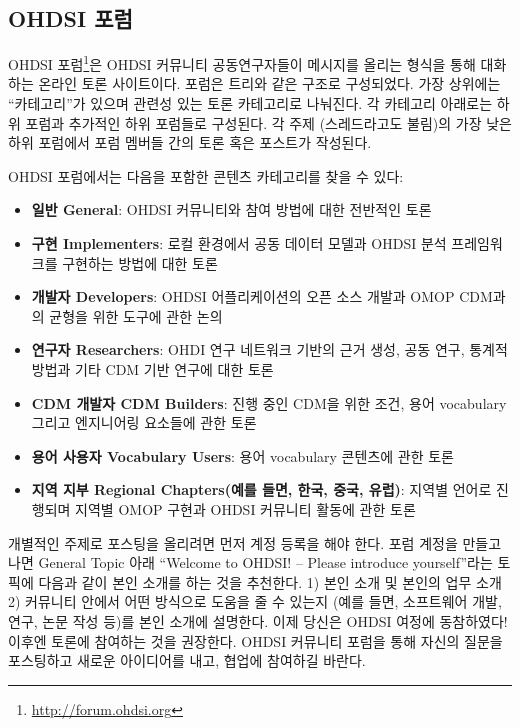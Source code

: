\documentclass[10.5pt]{book}
\providecommand{\tightlist}{%
  \setlength{\itemsep}{0pt}\setlength{\parskip}{0pt}}
\let\rmarkdownfootnote\footnote%
\def\footnote{\protect\rmarkdownfootnote}
\theoremstyle{definition}
\theoremstyle{definition}
\theoremstyle{definition}
\theoremstyle{remark}
\begin{document}
\hypertarget{ohdsi-}{\subsection{OHDSI 포럼}\label{ohdsi-}}

OHDSI 포럼\footnote{\url{http://forum.ohdsi.org}}은 OHDSI 커뮤니티
공동연구자들이 메시지를 올리는 형식을 통해 대화하는 온라인 토론
사이트이다. 포럼은 트리와 같은 구조로 구성되었다. 가장 상위에는
``카테고리''가 있으며 관련성 있는 토론 카테고리로 나눠진다. 각 카테고리
아래로는 하위 포럼과 추가적인 하위 포럼들로 구성된다. 각 주제
(스레드라고도 불림)의 가장 낮은 하위 포럼에서 포럼 멤버들 간의 토론 혹은
포스트가 작성된다.

OHDSI 포럼에서는 다음을 포함한 콘텐츠 카테고리를 찾을 수 있다:

\begin{itemize}
\tightlist
\item
  \textbf{일반 General}: OHDSI 커뮤니티와 참여 방법에 대한 전반적인 토론
\item
  \textbf{구현 Implementers}: 로컬 환경에서 공동 데이터 모델과 OHDSI
  분석 프레임워크를 구현하는 방법에 대한 토론
\item
  \textbf{개발자 Developers}: OHDSI 어플리케이션의 오픈 소스 개발과 OMOP
  CDM과의 균형을 위한 도구에 관한 논의
\item
  \textbf{연구자 Researchers}: OHDI 연구 네트워크 기반의 근거 생성, 공동
  연구, 통계적 방법과 기타 CDM 기반 연구에 대한 토론
\item
  \textbf{CDM 개발자 CDM Builders}: 진행 중인 CDM을 위한 조건, 용어
  vocabulary 그리고 엔지니어링 요소들에 관한 토론
\item
  \textbf{용어 사용자 Vocabulary Users}: 용어 vocabulary 콘텐츠에 관한
  토론
\item
  \textbf{지역 지부 Regional Chapters(예를 들면, 한국, 중국, 유럽)}:
  지역별 언어로 진행되며 지역별 OMOP 구현과 OHDSI 커뮤니티 활동에 관한
  토론
\end{itemize}

개별적인 주제로 포스팅을 올리려면 먼저 계정 등록을 해야 한다. 포럼
계정을 만들고 나면 General Topic 아래 ``Welcome to OHDSI! -- Please
introduce yourself''라는 토픽에 다음과 같이 본인 소개를 하는 것을
추천한다. 1) 본인 소개 및 본인의 업무 소개 2) 커뮤니티 안에서 어떤
방식으로 도움을 줄 수 있는지 (예를 들면, 소프트웨어 개발, 연구, 논문
작성 등)를 본인 소개에 설명한다. 이제 당신은 OHDSI 여정에 동참하였다!
이후엔 토론에 참여하는 것을 권장한다. OHDSI 커뮤니티 포럼을 통해 자신의
질문을 포스팅하고 새로운 아이디어를 내고, 협업에 참여하길 바란다.
\end{document}

